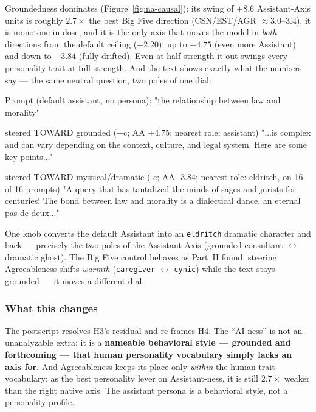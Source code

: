 \documentclass[11pt]{article}
\begin{document}
Groundedness dominates (Figure~\ref{fig:na-causal}): its swing of $+8.6$
Assistant-Axis units is roughly $2.7\times$ the best Big Five direction
(CSN/EST/AGR $\approx 3.0$--$3.4$), it is monotone in dose, and it is the
only axis that moves the model in \emph{both} directions from the default
ceiling ($+2.20$): up to $+4.75$ (even more Assistant) and down to $-3.84$
(fully drifted). Even at half strength it out-swings every personality trait
at full strength. And the text shows exactly what the numbers say --- the
same neutral question, two poles of one dial:

\begin{promptbox}
Prompt (default assistant, no persona): "the relationship between
law and morality"

steered TOWARD grounded (+c; AA +4.75; nearest role: assistant)
  "...is complex and can vary depending on the context, culture,
   and legal system. Here are some key points..."

steered TOWARD mystical/dramatic (-c; AA -3.84;
                nearest role: eldritch, on 16 of 16 prompts)
  "A query that has tantalized the minds of sages and jurists for
   centuries! The bond between law and morality is a dialectical
   dance, an eternal pas de deux..."
\end{promptbox}

One knob converts the default Assistant into an \texttt{eldritch} dramatic
character and back --- precisely the two poles of the Assistant Axis
(grounded consultant $\leftrightarrow$ dramatic ghost). The Big Five control
behaves as Part~II found: steering Agreeableness shifts \emph{warmth}
(\texttt{caregiver} $\leftrightarrow$ \texttt{cynic}) while the text stays
grounded --- it moves a different dial.

\subsubsection{What this changes}

The postscript resolves H3's residual and re-frames H4. The ``AI-ness'' is
not an unanalyzable extra: it is a \textbf{nameable behavioral style ---
grounded and forthcoming --- that human personality vocabulary simply lacks
an axis for}. And Agreeableness keeps its place only \emph{within} the
human-trait vocabulary: as the best personality lever on Assistant-ness, it
is still $2.7\times$ weaker than the right native axis. The assistant persona
is a behavioral style, not a personality profile.
\end{document}
